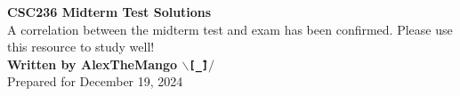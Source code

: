 \begin{titlepage}
    \null %
    \vfill
    \begin{center}
        {\fontsize{40}{48}\selectfont \bfseries CSC236 Midterm Test Solutions}
        \vspace{20pt} \\
        {\LARGE A correlation between the midterm test and exam has been confirmed. Please use this resource to study well!} \\
        \vspace{20pt}
        \textbf{Written by AlexTheMango $\backslash$\texttt{[\^\_\text{-}]$/$}}
        \vspace{8pt}
        \\ Prepared for December 19, 2024
    \end{center}
    \vfill
\end{titlepage}
